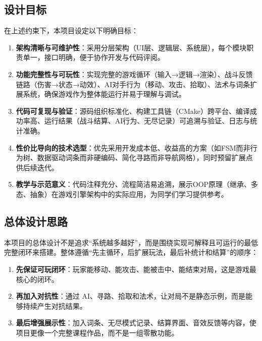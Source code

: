 ﻿\documentclass[utf8]{ctexart}
\begin{document}
\subsection{设计目标}

在上述约束下，本项目设定以下明确目标：

\begin{enumerate}
  \item \textbf{架构清晰与可维护性}：采用分层架构（UI层、逻辑层、系统层），每个模块职责单一，接口明确，便于协作开发与代码评阅。

  \item \textbf{功能完整性与可玩性}：实现完整的游戏循环（输入→逻辑→渲染）、战斗反馈链路（伤害→状态→动效）、AI对手行为（移动、攻击、拾取）、法术与词条扩展系统，确保游戏作为整体能运行并易于理解与调试。

  \item \textbf{代码可复现与验证}：源码组织标准化、构建工具链（CMake）跨平台、编译成功率高、运行结果（战斗结算、AI行为、无尽记录）可追溯与验证、日志与统计准确。

  \item \textbf{性价比导向的技术选型}：优先采用开发成本低、收益高的方案（如FSM而非行为树、数据驱动词条而非硬编码、简化寻路而非导航网格），同时预留扩展点供后续迭代。

  \item \textbf{教学与示范意义}：代码注释充分、流程简洁易追溯，展示OOP原理（继承、多态、抽象）在游戏引擎架构中的实际应用，为同学们学习提供参考。
\end{enumerate}

\subsection{总体设计思路}

本项目的总体设计不是追求“系统越多越好”，而是围绕实现可解释且可运行的最低完整闭环来搭建。整体遵循“先主循环，后扩展玩法，最后补统计和结算”的顺序：

\begin{enumerate}
  \item \textbf{先保证可玩闭环}：玩家能移动、能攻击、能被击中、能结束对局，这是游戏最核心的闭环。
  \item \textbf{再加入对抗性}：通过 AI、寻路、拾取和法术，让对局不是静态示例，而是能够持续产生对抗结果。
  \item \textbf{最后增强展示性}：加入词条、无尽模式记录、结算界面、音效反馈等内容，使项目更像一个完整课程作品，而不是一组零散功能。
\end{enumerate}
\end{document}
